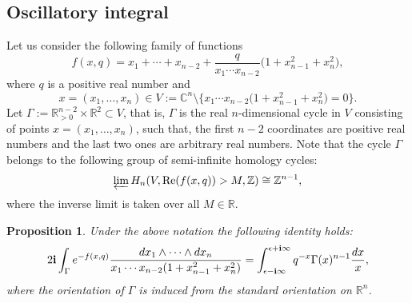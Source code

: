 \documentclass[10pt,a4paper]{article}
\numberwithin{equation}{section}
\newtheorem{Proposition}[Theorem]{Proposition}
\newcommand{\CC}{\mathbb{C}}
\newcommand{\ZZ}{\mathbb{Z}}
\newcommand{\RR}{\mathbb{R}}
\newcommand{\ii}{\mathbf{i}}
\begin{document}
\subsection{Oscillatory integral}

Let us consider the following family of functions
\[
f(x,q)=x_1+\cdots + x_{n-2} +
\frac{q}{ x_1\cdots x_{n-2}} \big(1+x_{n-1}^2+x_n^2\big),
\]
where $q$ is a positive real number and
\[
x=(x_1,\dots, x_n)\in V:=\CC^n\setminus{\big\{
x_1\cdots x_{n-2} \big(1+x_{n-1}^2+x_n^2\big)= 0\big\} }.
\]
Let $\Gamma:=\RR^{n-2}_{>0}\times \RR^2 \subset V$, that is, $\Gamma$
is the real $n$-dimensional cycle in $V$ consisting of points $x=(x_1,\dots,x_n)$,
such that, the first $n-2$ coordinates are positive real numbers and
the last two ones are arbitrary real numbers. Note that the cycle
$\Gamma$ belongs to the following group of
semi-infinite homology cycles:
\[
\varprojlim H_n (V, \operatorname{Re}(f(x,q))>M,\ZZ)\cong \ZZ^{n-1},
\]
where the inverse limit is taken over all $M\in \RR$.
\begin{Proposition}\label{prop:oscil_int}
Under the above notation the following identity holds:
\[
2\ii
\int_{\Gamma} e^{-f(x,q)}
\frac{{\rm d}x_1\wedge \cdots \wedge {\rm d}x_n}{
x_1\cdots x_{n-2} (1+x_{n-1}^2+x_n^2) } =
\int_{\epsilon-\ii\infty}^{\epsilon+\ii\infty}
q^{-x} \Gamma(x)^{n-1} \frac{{\rm d}x}{x},
\]
where the orientation of $\Gamma$ is induced from the standard
orientation on $\RR^n$.
\end{Proposition}
\end{document}
